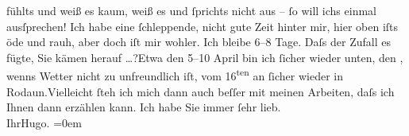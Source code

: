 \begin{ledgroupsized}[t]{13cm}
               fühlts und weiß es kaum, weiß es und ſprichts nicht aus – {\pb}ſo will ichs einmal
               ausſprechen!\pend
           \pstart
           Ich habe eine ſchleppende, nicht gute Zeit hinter mir, hier oben iſts öde und rauh,
               aber doch iſt mir wohler.\pend
           \pstart
           Ich bleibe \label{K_L02167_2v}\label{K_L02167_2h} 6–8 Tage. Daſs der Zufall es fügte, Sie kämen
               herauf {\dots}?\hspace*{1.5em}Etwa den
                  5–10 April bin ich ſicher wieder unten, den \label{K_L02167_3v}\label{K_L02167_3h}, wenns Wetter nicht zu unfreundlich iſt, vom
                     16\textsuperscript{ten} an ſicher wieder in Rodaun.\hspace*{1.5em}Vielleicht ſteh ich mich dann auch beſſer  mit meinen Arbeiten, daſs ich Ihnen dann erzählen
               kann.\pend
           \pstart
           Ich habe Sie immer ſehr lieb.{\\[\baselineskip]}Ihr\spacefill\mbox{Hugo.}\pend
           \leftskip=0em{}\endnumbering{}\end{ledgroupsized}  \newcommand{\dateiname}{L02167}\newcommand{\titel}{Hugo von Hofmannsthal an Arthur Schnitzler, 27. 3. [1914]}\newcommand{\editorInnen}{Martin Anton Müller und Gerd-Hermann Susen}
      